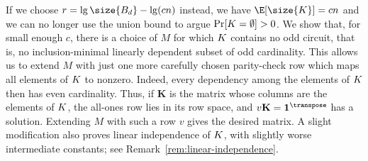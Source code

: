 If we choose $r = \lg\size{\ball}-\lg(cn)$ instead, we have
$\E[\size{\kero}]=cn$ and we can no longer use the union
bound to argue $\Pr[K=\emptyset]>0$. We show that, for
small enough $c$, there is a choice of $M$ for which $K$
contains no odd circuit, that is, no inclusion-minimal
linearly dependent subset of odd cardinality. This allows
us to extend $M$ with just one more carefully chosen
parity-check row which maps all elements of $K$ to
nonzero. Indeed, every dependency among the elements of
$K$ then has even cardinality. Thus, if $\mathbf K$ is
the matrix whose columns are the elements of $K$, the
all-ones row lies in its row space, and
$v\mathbf K=\mathbf{1}^\transpose$ has a solution.
Extending $M$ with such a row $v$ gives the desired matrix.
A slight modification also proves linear independence of
$K$, with slightly worse intermediate constants; see
Remark~\ref{rem:linear-independence}.
